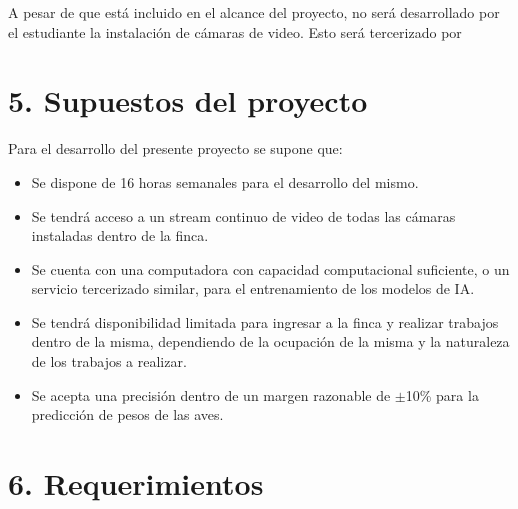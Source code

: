 \documentclass[
11pt, %
]{charter}
\begin{document}
A pesar de que está incluido en el alcance del proyecto, no será desarrollado por el estudiante la instalación de cámaras de video. Esto será tercerizado por \empclientename

\section{5. Supuestos del proyecto}
\label{sec:supuestos}
Para el desarrollo del presente proyecto se supone que:

\begin{itemize}
	\item Se dispone de 16 horas semanales para el desarrollo del mismo.
	\item Se tendrá acceso a un stream continuo de video de todas las cámaras instaladas dentro de la finca. 
	\item Se cuenta con una computadora con capacidad computacional suficiente, o un servicio tercerizado similar, para el entrenamiento de los modelos de IA.
	\item Se tendrá disponibilidad limitada para ingresar a la finca y realizar trabajos dentro de la misma, dependiendo de la ocupación de la misma y la naturaleza de los trabajos a realizar.
	\item Se acepta una precisión dentro de un margen razonable de $\pm$10\% para la predicción de pesos de las aves. 
\end{itemize}

\section{6. Requerimientos}
\label{sec:requerimientos}
\end{document}
